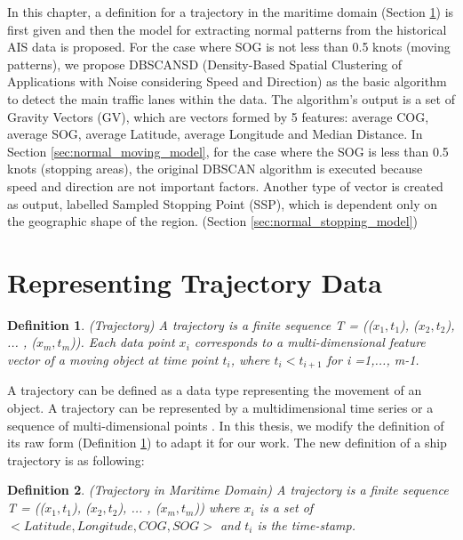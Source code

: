 \documentclass[12pt,glossary]{dalcsthesis}
\newtheorem{definition}{Definition}
\begin{document}
In this chapter, a definition for a trajectory in the maritime domain (Section \ref{sec:trajectory_representation}) is first given and then the model for extracting normal patterns from the historical AIS data is proposed.  %
For the case where SOG is not less than 0.5 knots (moving patterns), we propose DBSCANSD (Density-Based Spatial Clustering of Applications with Noise considering Speed and Direction) as the basic algorithm to detect the main traffic lanes within the data. The algorithm's output is a set of Gravity Vectors (GV), which are vectors formed by 5 features: average COG, average SOG, average Latitude, average Longitude and Median Distance. In Section \ref{sec:normal_moving_model},  for the case where the SOG is less than 0.5 knots (stopping areas), the original DBSCAN \cite{DBScan96} algorithm is executed because speed and direction are not important factors. Another type of vector is created as output, labelled Sampled Stopping Point (SSP), which is dependent only on the geographic shape of the region. (Section \ref{sec:normal_stopping_model}) 

\section{Representing Trajectory Data} \label{sec:trajectory_representation}

\begin{definition}
\label{def:trajectory_raw}
(Trajectory) A trajectory is a finite sequence T = (($x_1, t_1$), ($x_2, t_2$), ... , ($x_m, t_m$)). Each data point $x_i$ corresponds to a multi-dimensional feature vector of a moving object at time point $t_i$, where $t_i < t_{i+1}$ for i =1,..., m-1.
\end{definition}

A trajectory can be defined as a data type representing the movement of an object. A trajectory can be represented by a multidimensional time series \cite{aggarwal2013data} or a sequence of multi-dimensional points \cite{Lee07}. In this thesis, we modify the definition of its raw form (Definition \ref{def:trajectory_raw}) \cite{phdthesis} to adapt it for our work. The new definition of a ship trajectory is as following:

\begin{definition}
\label{def:trajectory}
(Trajectory in Maritime Domain) A trajectory is a finite sequence T = (($x_1, t_1$), ($x_2, t_2$), ... , ($x_m, t_m$)) where $x_i$ is a set of $<Latitude, Longitude, COG, SOG>$ and $t_i$ is the time-stamp.
\end{definition}
\end{document}
